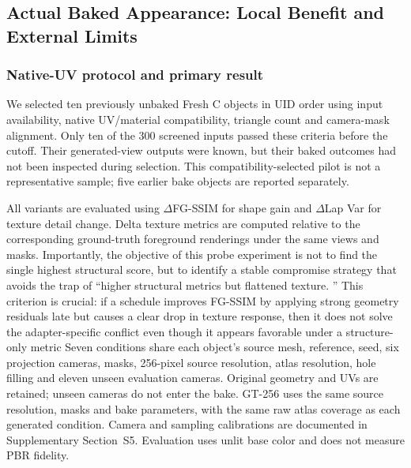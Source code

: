 \documentclass[times,twocolumn,final]{elsarticle}
\providecommand{\DIFadd}[1]{{\protect\color{blue} \sf #1}} %
\providecommand{\DIFdel}[1]{{\protect\color{red} \scriptsize #1}} %
\providecommand{\DIFaddbegin}{} %
\providecommand{\DIFaddend}{} %
\providecommand{\DIFdelbegin}{} %
\providecommand{\DIFdelend}{} %
\begin{document}
\subsection{Actual Baked Appearance: Local Benefit and External Limits}
\label{subsec:new-bake}
\subsubsection{Native-UV protocol and primary result}
\DIFadd{We selected ten previously unbaked Fresh C objects in UID order using input availability, native UV/material compatibility, triangle count and camera-mask alignment. Only ten of the 300 screened inputs passed these criteria before the cutoff. Their generated-view outputs were known, but their baked outcomes had not been inspected during selection. This compatibility-selected pilot is not a representative sample; five earlier bake objects are reported separately}\DIFaddend .

\DIFdelbegin \DIFdel{All variants are evaluated using $\Delta$FG-SSIM for shape gain and $\Delta$Lap Var for texture detail change. Delta texture metrics are computed relative to the corresponding ground-truth foreground renderings under the same views and masks. Importantly, the objective of this probe experiment is not to find the single highest structural score, but to identify a stable compromise strategy that avoids the trap of ``higher structural metrics but flattened texture. '' This criterion is crucial: if a schedule improves FG-SSIM by applying strong geometry residuals late but causes a clear drop in texture response, then it does not solve the adapter-specific conflict even though it appears favorable under a structure-only metric}\DIFdelend \DIFaddbegin \DIFadd{Seven conditions share each object's source mesh, reference, seed, six projection cameras, masks, 256-pixel source resolution, atlas resolution, hole filling and eleven unseen evaluation cameras. Original geometry and UVs are retained; unseen cameras do not enter the bake. GT-256 uses the same source resolution, masks and bake parameters, with the same raw atlas coverage as each generated condition. Camera and sampling calibrations are documented in Supplementary Section~S5. Evaluation uses unlit base color and does not measure PBR fidelity}\DIFaddend .
\end{document}
